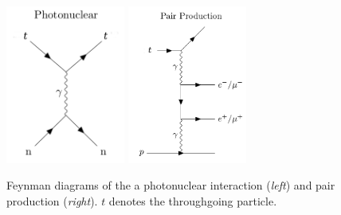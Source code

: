 \begin{figure}
\centering
\includegraphics[width = 0.35\textwidth]{chapter4/img/Feynman_PhotoNuclear_2.png}
\includegraphics[width = 0.35\textwidth]{chapter4/img/Feynman_PairProduction_2.png}
\caption{Feynman diagrams of the a photonuclear interaction (\textit{left}) and pair production (\textit{right}). $t$ denotes the throughgoing particle.}
\label{fig:feynmannuclpairprod}
\end{figure}